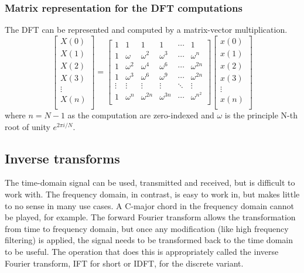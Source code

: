 \subsubsection{Matrix representation for the DFT computations} 
The DFT can be represented and computed by a matrix-vector multiplication. 
$$
\begin{bmatrix}
    X(0) \\
    X(1) \\
    X(2) \\
    X(3) \\
    \vdots\\
    X(n) \\
\end{bmatrix}
=
\begin{bmatrix}
    1 & 1 & 1 & 1 & \cdots & 1\\
    1 & \omega & \omega ^2 & \omega ^3 & \cdots & \omega ^n\\
    1 & \omega ^2 & \omega ^4 & \omega ^6 & \cdots & \omega ^{2n}\\
    1 & \omega ^3 & \omega ^6 & \omega ^9 & \cdots & \omega ^{2n}\\
    \vdots & \vdots & \vdots & \vdots & \ddots & \vdots \\
    1 & \omega ^{n} & \omega ^{2n} & \omega ^{3n} & \cdots & \omega ^{{n^2}}\\
\end{bmatrix}
\begin{bmatrix}
    x(0) \\
    x(1) \\
    x(2) \\
    x(3) \\
    \vdots\\
    x(n) \\
\end{bmatrix}
$$
where $n = N-1$ as the computation are zero-indexed and $\omega$ is the principle N-th root of unity $e^{2\pi i/N} $. 


\subsection{Inverse transforms}
The time-domain signal can be used, transmitted and received, but is difficult to work with. The frequency domain, in contrast, is easy to work in, but makes little to no sense in many use cases. A C-major chord in the frequency domain cannot be played, for example. The forward Fourier transform allows the transformation from time to frequency domain, but once any modification (like high frequency filtering) is applied, the signal needs to be transformed back to the time domain to be useful. The operation that does this is appropriately called the inverse Fourier transform, IFT for short or IDFT, for the discrete variant.

